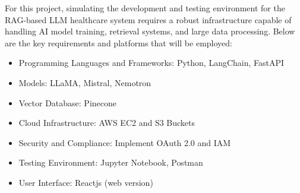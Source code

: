 For this project, simulating the development and testing environment for the RAG-based LLM healthcare system requires a robust infrastructure capable of handling AI model training, retrieval systems, and large data processing. Below are the key requirements and platforms that will be employed:
\begin{itemize}
    \item Programming Languages and Frameworks: Python, LangChain, FastAPI 
    \item Models: LLaMA, Mistral, Nemotron
    \item Vector Database: Pinecone
    \item Cloud Infrastructure: AWS EC2 and S3 Buckets
    \item Security and Compliance: Implement OAuth 2.0 and IAM
    \item Testing Environment: Jupyter Notebook, Postman
    \item User Interface: Reactjs (web version)
\end{itemize}